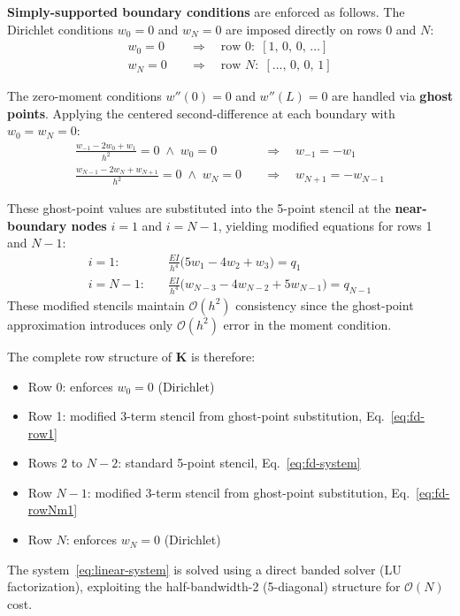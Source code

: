 \textbf{Simply-supported boundary conditions} are enforced as follows.
The Dirichlet conditions $w_0 = 0$ and $w_N = 0$ are imposed directly on rows 0 and $N$:
\begin{align}
  w_0 = 0 \quad &\Rightarrow \quad \text{row } 0: \; [1,\, 0,\, 0,\, \ldots] \\
  w_N = 0 \quad &\Rightarrow \quad \text{row } N: \; [\ldots,\, 0,\, 0,\, 1]
\end{align}

The zero-moment conditions $w''(0) = 0$ and $w''(L) = 0$ are handled via \textbf{ghost points}.
Applying the centered second-difference at each boundary with $w_0 = w_N = 0$:
\begin{align}
  \frac{w_{-1} - 2w_0 + w_1}{h^2} = 0 \;\wedge\; w_0 = 0
    \quad &\Rightarrow \quad w_{-1} = -w_1 \\
  \frac{w_{N-1} - 2w_N + w_{N+1}}{h^2} = 0 \;\wedge\; w_N = 0
    \quad &\Rightarrow \quad w_{N+1} = -w_{N-1}
\end{align}

These ghost-point values are substituted into the 5-point stencil at the \textbf{near-boundary nodes} $i = 1$ and $i = N-1$, yielding modified equations for rows 1 and $N-1$:
\begin{align}
  i = 1: &\quad \frac{EI}{h^4}\bigl(5w_1 - 4w_2 + w_3\bigr) = q_1
    \label{eq:fd-row1} \\
  i = N-1: &\quad \frac{EI}{h^4}\bigl(w_{N-3} - 4w_{N-2} + 5w_{N-1}\bigr) = q_{N-1}
    \label{eq:fd-rowNm1}
\end{align}
These modified stencils maintain $\mathcal{O}(h^2)$ consistency since the ghost-point approximation introduces only $\mathcal{O}(h^2)$ error in the moment condition.

The complete row structure of $\mathbf{K}$ is therefore:
\begin{itemize}
  \item Row 0: enforces $w_0 = 0$ (Dirichlet)
  \item Row 1: modified 3-term stencil from ghost-point substitution, Eq.~\eqref{eq:fd-row1}
  \item Rows 2 to $N-2$: standard 5-point stencil, Eq.~\eqref{eq:fd-system}
  \item Row $N-1$: modified 3-term stencil from ghost-point substitution, Eq.~\eqref{eq:fd-rowNm1}
  \item Row $N$: enforces $w_N = 0$ (Dirichlet)
\end{itemize}

The system~\eqref{eq:linear-system} is solved using a direct banded solver (LU factorization), exploiting the half-bandwidth-2 (5-diagonal) structure for $\mathcal{O}(N)$ cost.

